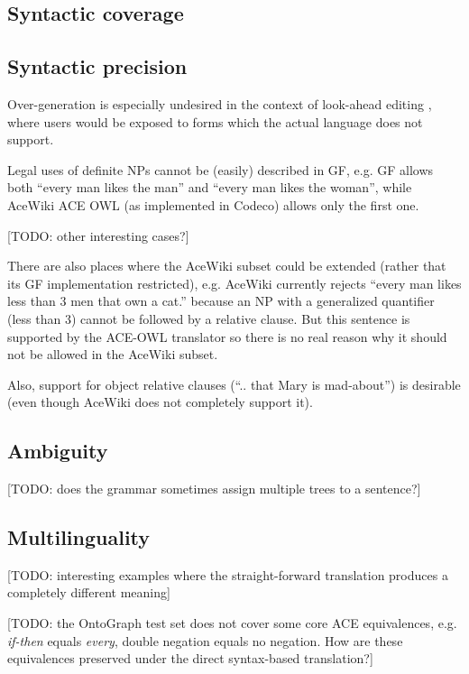 \documentclass[a4paper]{article}
\begin{document}
\subsection{Syntactic coverage}


\subsection{Syntactic precision}

Over-generation is especially undesired in the context of look-ahead editing
\cite{schwitter:eamt-claw2003}, where users would be exposed to
forms which the actual language does not support.

Legal uses of definite NPs cannot be (easily) described in GF, e.g. GF
allows both ``every man likes the man'' and ``every man likes the woman'',
while AceWiki ACE OWL (as implemented in Codeco) allows only the
first one.

[TODO: other interesting cases?]

There are also
places where the AceWiki subset could be extended (rather that its GF
implementation restricted), e.g. AceWiki currently rejects ``every man
likes less than 3 men that own a cat.'' because an NP with a
generalized quantifier (less than 3) cannot be followed by a relative
clause. But this sentence is supported by the ACE-OWL translator
so there is no real reason why it should not be allowed in the
AceWiki subset.

Also, support for object relative clauses (``.. that Mary is mad-about'')
is desirable (even though AceWiki does not completely support it).


\subsection{Ambiguity}

[TODO: does the grammar sometimes assign multiple trees to a sentence?]

\subsection{Multilinguality}

[TODO: interesting examples where the straight-forward translation produces
a completely different meaning]

[TODO: the OntoGraph test set does not cover some core ACE equivalences,
e.g. \emph{if-then} equals \emph{every}, double negation equals no negation.
How are these equivalences preserved under the direct syntax-based
translation?]
\end{document}
